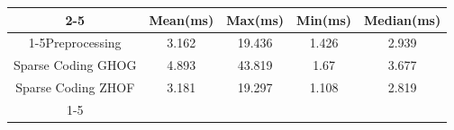 \documentclass{standalone}
\begin{document}
 
 \begin{tabular}{|c |c |c |c |c |}
\cline{2-5}\cline{2-5} \multicolumn{1}{c |}{ } & Mean(ms) & Max(ms) & Min(ms) & Median(ms)\\ 
\cline{1-5}Preprocessing & 3.162 & 19.436 & 1.426 & 2.939\\ 
 \hhline{|=|=|=|=|=|}Sparse Coding GHOG & 4.893 & 43.819 & 1.67 & 3.677\\ 
 \hhline{|=|=|=|=|=|}Sparse Coding ZHOF & 3.181 & 19.297 & 1.108 & 2.819\\ 
 \cline{1-5}\hline \end{tabular}
 
\end{document}
